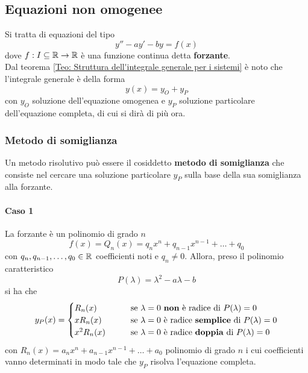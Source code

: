 \subsection{Equazioni non omogenee}
Si tratta di equazioni del tipo
\begin{equation*}
    y'' - ay'-by=f(x)
\end{equation*}
dove $f:I \subseteq \mathbb{R} \to \mathbb{R}$ è una funzione continua detta \textbf{forzante}.\\
Dal teorema \ref{Teo: Struttura dell'integrale generale per i sistemi} è noto che l'integrale generale è della forma 
\begin{equation*}
    y(x)= y_{O}+ y_{P}
\end{equation*}
con $y_{O}$ soluzione dell'equazione omogenea e $y_{P}$ soluzione particolare dell'equazione completa, di cui si dirà di più ora.
\subsubsection{Metodo di somiglianza}
Un metodo risolutivo può essere il cosiddetto \textbf{metodo di somiglianza} che consiste nel cercare una soluzione particolare $y_P$ sulla base della sua somiglianza alla forzante.
\paragraph{Caso 1} La forzante è un polinomio di grado $n$
\begin{equation*}
    f(x)=Q_n(x)= q_nx^n+q_{n-1}x^{n-1}+ \dots +q_0
\end{equation*}
con $q_n, q_{n-1}, \dots, q_0 \in \mathbb{R}$ coefficienti noti e $q_n \neq 0$.
Allora, preso il polinomio caratteristico
\begin{equation*}
    P(\lambda)=\lambda^2 - a\lambda-b
\end{equation*}
si ha che
\begin{equation*}
    y_P(x)=\begin{cases}
        R_n(x) &\qquad \text{se}\ \lambda=0\ \text{\textbf{non} è radice di}\ P(\lambda)=0\\
        xR_n(x) &\qquad \text{se}\ \lambda=0\ \text{è radice \textbf{semplice} di}\ P(\lambda)=0\\
        x^2R_n(x) &\qquad \text{se}\ \lambda=0\ \text{è radice \textbf{doppia} di}\ P(\lambda)=0\\
    \end{cases}
\end{equation*}
con $R_n(x)=a_nx^n+ a_{n-1}x^{n-1}+\dots+a_0$ polinomio di grado $n$ i cui coefficienti vanno determinati in modo tale che $y_P$ risolva l'equazione completa.

